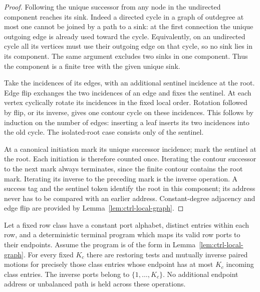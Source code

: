 \begin{proof}
Following the unique successor from any node in the undirected
component reaches its sink.  Indeed a directed cycle in a graph of
outdegree at most one cannot be joined by a path to a sink: at the
first connection the unique outgoing edge is already used toward the
cycle.  Equivalently, on an undirected cycle all its vertices must use
their outgoing edge on that cycle, so no sink lies in its component.
The same argument excludes two sinks in one component.  Thus the
component is a finite tree with the given unique sink.

Take the incidences of its edges, with an additional sentinel incidence
at the root.  Edge flip exchanges the two incidences of an edge and
fixes the sentinel.  At each vertex cyclically rotate its incidences in
the fixed local order.  Rotation followed by flip, or its inverse,
gives one contour cycle on these incidences.  This follows by induction
on the number of edges: inserting a leaf inserts its two incidences
into the old cycle.  The isolated-root case consists only of the
sentinel.

At a canonical initiation mark its unique successor incidence; mark
the sentinel at the root.  Each initiation is therefore counted once.
Iterating the contour successor to the next mark always terminates,
since the finite contour contains the root mark.  Iterating its inverse
to the preceding mark is the inverse operation.  A success tag and the
sentinel token identify the root in this component; its address never
has to be compared with an earlier address.  Constant-degree adjacency
and edge flip are provided by Lemma~\ref{lem:ctrl-local-graph}.
\end{proof}

\begin{lemma}\label{lem:ctrl-cap}
Let a fixed row class have a constant port alphabet, distinct entries
within each row, and a deterministic terminal program which maps its
valid row ports to their endpoints.  Assume the program is of the form
in Lemma~\ref{lem:ctrl-local-graph}.  For every fixed $K_c$ there are
restoring tests and mutually inverse paired motions for precisely those
class entries whose endpoint has at most $K_c$ incoming class entries.
The inverse ports belong to $\{1,\ldots,K_c\}$.  No additional endpoint
address or unbalanced path is held across these operations.
\end{lemma}

